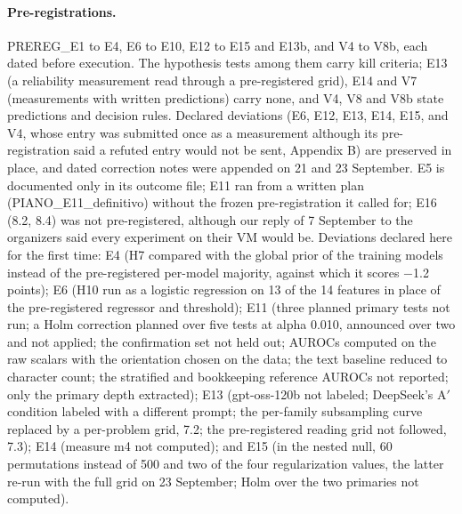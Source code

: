 \paragraph{Pre-registrations.}
PREREG\_E1 to E4, E6 to E10, E12 to E15 and E13b, and V4 to V8b, each dated before execution. The hypothesis tests among them carry kill criteria; E13 (a reliability measurement read through a pre-registered grid), E14 and V7 (measurements with written predictions) carry none, and V4, V8 and V8b state predictions and decision rules. Declared deviations (E6, E12, E13, E14, E15, and V4, whose entry was submitted once as a measurement although its pre-registration said a refuted entry would not be sent, Appendix B) are preserved in place, and dated correction notes were appended on 21 and 23 September. E5 is documented only in its outcome file; E11 ran from a written plan (PIANO\_E11\_definitivo) without the frozen pre-registration it called for; E16 (8.2, 8.4) was not pre-registered, although our reply of 7 September to the organizers said every experiment on their VM would be. Deviations declared here for the first time: E4 (H7 compared with the global prior of the training models instead of the pre-registered per-model majority, against which it scores $-$1.2 points); E6 (H10 run as a logistic regression on 13 of the 14 features in place of the pre-registered regressor and threshold); E11 (three planned primary tests not run; a Holm correction planned over five tests at alpha 0.010, announced over two and not applied; the confirmation set not held out; AUROCs computed on the raw scalars with the orientation chosen on the data; the text baseline reduced to character count; the stratified and bookkeeping reference AUROCs not reported; only the primary depth extracted); E13 (gpt-oss-120b not labeled; DeepSeek's A$'$ condition labeled with a different prompt; the per-family subsampling curve replaced by a per-problem grid, 7.2; the pre-registered reading grid not followed, 7.3); E14 (measure m4 not computed); and E15 (in the nested null, 60 permutations instead of 500 and two of the four regularization values, the latter re-run with the full grid on 23 September; Holm over the two primaries not computed).

